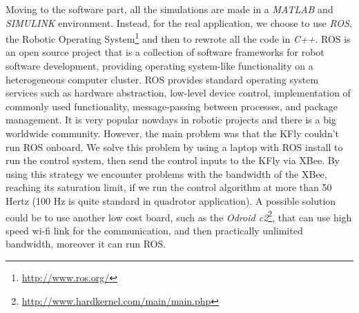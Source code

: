 \noindent Moving to the software part, all the simulations are made in a \textit{MATLAB} and \textit{SIMULINK} environment. Instead, for the real application, we choose to use \textit{ROS}, the Robotic Operating System\footnote{\url{http://www.ros.org/}} and then to rewrote all the code in \textit{C++}. ROS is an open source project that is a collection of software frameworks for robot software development, providing operating system-like functionality on a heterogeneous computer cluster. ROS provides standard operating system services such as hardware abstraction, low-level device control, implementation of commonly used functionality, message-passing between processes, and package management. It is very popular nowdays in robotic projects and there is a big worldwide community. However, the main problem was that the KFly couldn't run ROS onboard. We solve this problem by using a laptop with ROS install to run the control system, then send the control inputs to the KFly via XBee. By using this strategy we encounter problems with the bandwidth of the XBee, reaching its saturation limit, if we run the control algorithm at more than 50 Hertz (100 Hz is quite standard in quadrotor application). A possible solution could be to use another low cost board, such as the \textit{Odroid c2}\footnote{\url{http://www.hardkernel.com/main/main.php}}, that can use high speed wi-fi link for the communication, and then practically unlimited bandwidth, moreover it can run ROS. 